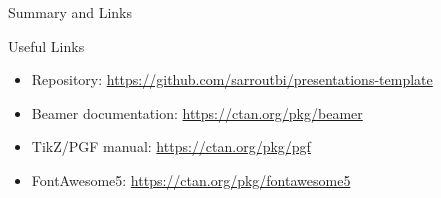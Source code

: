 \begin{frame}{Summary and Links}
  \vspace{0.05cm}

  \begin{exampleblock}{Useful Links}
    \tiny
    \begin{itemize}
      \setlength{\itemsep}{0pt}
      \item Repository: \url{https://github.com/sarroutbi/presentations-template}
      \item Beamer documentation: \url{https://ctan.org/pkg/beamer}
      \item TikZ/PGF manual: \url{https://ctan.org/pkg/pgf}
      \item FontAwesome5: \url{https://ctan.org/pkg/fontawesome5}
    \end{itemize}
  \end{exampleblock}
\end{frame}


